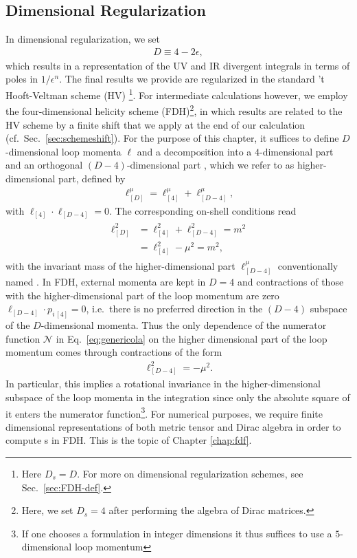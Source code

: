 \subsection{Dimensional Regularization}
\label{sec:dimregfdh}
In dimensional regularization, we set
\begin{align}
  D\equiv 4-2\epsilon,
\end{align}
which results in a representation of the UV and IR divergent integrals
in terms of poles in $1/\epsilon^n$. The final results we
provide are regularized in the standard 't
Hooft-Veltman scheme (HV) \cite{tHooft:1972tcz}\footnote{Here $D_s=D$. For more on dimensional regularization schemes, see Sec.~\ref{sec:FDH-def}.}. For intermediate calculations however, we employ the four-dimensional
helicity scheme (FDH)\footnote{Here, we set $D_s=4$ after performing
  the algebra of Dirac matrices.}, in which results are related to the HV scheme by a finite shift
that we apply at the end of our calculation
(cf.~Sec.~\ref{sec:schemeshift}). For the purpose of this chapter, it
suffices to define $D$-dimensional loop momenta $\ell$ and a
decomposition into a
$4$-dimensional part and an orthogonal $(D-4)$-dimensional part
\cite{Bern:1995db}, which we refer to as higher-dimensional part,
defined by
\begin{align}\label{eq:lsplit}
  \ell^\mu_{[D]}=\ell_{[4]}^\mu + \ell_{[D-4]}^\mu,
\end{align}
with $\ell_{[4]}\cdot \ell_{[D-4]} = 0$. The corresponding on-shell conditions read
\begin{align}\label{eq:ddimos}
\begin{split}
  \ell^2_{[D]}&=\ell_{[4]}^2+\ell^2_{[D-4]}=m^2\\
&=\ell_{[4]}^2-\mu^2=m^2,
\end{split}
\end{align}
with the invariant mass of the higher-dimensional part
$\ell_{[D-4]}^\mu$ conventionally
named . In FDH, external momenta are kept in $D=4$ and contractions of those with
the higher-dimensional part of the loop momentum are zero
$\ell_{[D-4]}\cdot p_{i\,[4]} = 0$, i.e.~there is no preferred direction in the
$(D-4)$ subspace of the $D$-dimensional momenta. Thus the only dependence of the numerator
function $\mathcal{N}$ in Eq.~\eqref{eq:genericola} on the higher
dimensional part of the loop momentum comes through contractions of
the form
\begin{align}
  \ell^2_{[D-4]}=-\mu^2.
\end{align}
In particular, this
implies a rotational invariance in the higher-dimensional subspace of
the loop momenta in the integration since only the absolute square of it enters the
numerator function\footnote{If one chooses a formulation in integer
  dimensions it thus suffices to use a $5$-dimensional loop
  momentum}. For numerical purposes, we require finite dimensional representations of both metric tensor and Dirac
algebra in order to compute \ola s in FDH. This is the topic of Chapter \ref{chap:fdf}.



